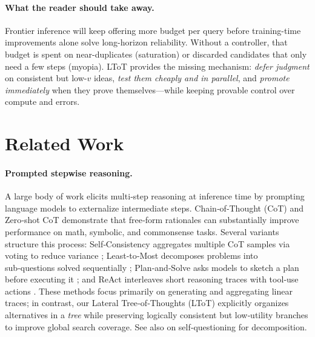\documentclass{article}
\begin{document}
\paragraph{What the reader should take away.}
Frontier inference will keep offering more budget per query before training-time improvements alone solve long-horizon reliability.
Without a controller, that budget is spent on near-duplicates (saturation) or discarded candidates that only need a few steps (myopia).
LToT provides the missing mechanism: \emph{defer judgment} on consistent but low-$v$ ideas, \emph{test them cheaply and in parallel}, and \emph{promote immediately} when they prove themselves—while keeping provable control over compute and errors.

\section{Related Work}
\label{section:prior-work}

\paragraph{Prompted stepwise reasoning.}
A large body of work elicits multi‑step reasoning at inference time by prompting language models to externalize intermediate steps. Chain‑of‑Thought (CoT) \citep{wei2022cot} and Zero‑shot CoT \citep{kojima2022zeroshotcot} demonstrate that free‑form rationales can substantially improve performance on math, symbolic, and commonsense tasks. Several variants structure this process: Self‑Consistency aggregates multiple CoT samples via voting to reduce variance \citep{wang2022selfconsistency}; Least‑to‑Most decomposes problems into sub‑questions solved sequentially \citep{zhou2022ltm}; Plan‑and‑Solve asks models to sketch a plan before executing it \citep{wang2023planandsolve}; and ReAct interleaves short reasoning traces with tool‑use actions \citep{yao2023react}. These methods focus primarily on generating and aggregating linear traces; in contrast, our Lateral Tree‑of‑Thoughts (LToT) explicitly organizes alternatives in a \emph{tree} while preserving logically consistent but low‑utility branches to improve global search coverage. See also \citet{press2022selfask} on self‑questioning for decomposition.
\end{document}
